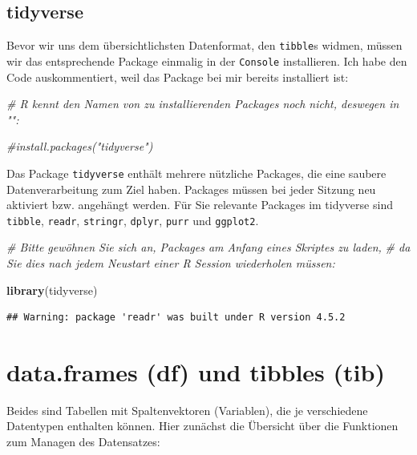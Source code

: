 \documentclass[
  ngerman,
]{book}
\newenvironment{Shaded}{\begin{snugshade}}{\end{snugshade}}
\newcommand{\CommentTok}[1]{\textcolor[rgb]{0.56,0.35,0.01}{\textit{#1}}}
\newcommand{\FunctionTok}[1]{\textcolor[rgb]{0.13,0.29,0.53}{\textbf{#1}}}
\newcommand{\NormalTok}[1]{#1}
\begin{document}
\subsection{tidyverse}\label{tidyverse}

Bevor wir uns dem übersichtlichsten Datenformat, den \texttt{tibble}s widmen, müssen wir das entsprechende Package einmalig in der \texttt{Console} installieren. Ich habe den Code auskommentiert, weil das Package bei mir bereits installiert ist:

\begin{Shaded}
\begin{Highlighting}[]
\CommentTok{\# R kennt den Namen von zu installierenden Packages noch nicht, deswegen in "":}

\CommentTok{\#install.packages("tidyverse")}
\end{Highlighting}
\end{Shaded}

Das Package \texttt{tidyverse} enthält mehrere nützliche Packages, die eine saubere Datenverarbeitung zum Ziel haben. Packages müssen bei jeder Sitzung neu aktiviert bzw. angehängt werden. Für Sie relevante Packages im tidyverse sind \texttt{tibble}, \texttt{readr}, \texttt{stringr}, \texttt{dplyr}, \texttt{purr} und \texttt{ggplot2}.

\begin{Shaded}
\begin{Highlighting}[]
\CommentTok{\# Bitte gewöhnen Sie sich an, Packages am Anfang eines Skriptes zu laden, }
\CommentTok{\# da Sie dies nach jedem Neustart einer R Session wiederholen müssen:}

\FunctionTok{library}\NormalTok{(tidyverse)}
\end{Highlighting}
\end{Shaded}

\begin{verbatim}
## Warning: package 'readr' was built under R version 4.5.2
\end{verbatim}

\section{data.frames (df) und tibbles (tib)}\label{data.frames-df-und-tibbles-tib}

Beides sind Tabellen mit Spaltenvektoren (Variablen), die je verschiedene Datentypen enthalten können. Hier zunächst die Übersicht über die Funktionen zum Managen des Datensatzes:
\end{document}
